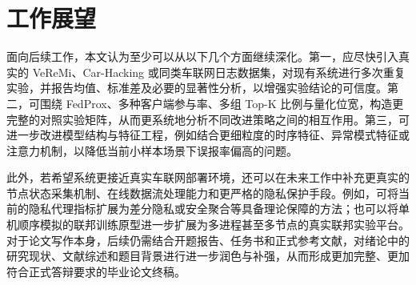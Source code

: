 \section{工作展望}

面向后续工作，本文认为至少可以从以下几个方面继续深化。第一，应尽快引入真实的 VeReMi、Car-Hacking 或同类车联网日志数据集，对现有系统进行多次重复实验，并报告均值、标准差及必要的显著性分析，以增强实验结论的可信度。第二，可围绕 FedProx、多种客户端参与率、多组 Top-K 比例与量化位宽，构造更完整的对照实验矩阵，从而更系统地分析不同改进策略之间的相互作用。第三，可进一步改进模型结构与特征工程，例如结合更细粒度的时序特征、异常模式特征或注意力机制，以降低当前小样本场景下误报率偏高的问题。

此外，若希望系统更接近真实车联网部署环境，还可以在未来工作中补充更真实的节点状态采集机制、在线数据流处理能力和更严格的隐私保护手段。例如，可将当前的隐私代理指标扩展为差分隐私或安全聚合等具备理论保障的方法；也可以将单机顺序模拟的联邦训练原型进一步扩展为多进程甚至多节点的真实联邦实验平台。对于论文写作本身，后续仍需结合开题报告、任务书和正式参考文献，对绪论中的研究现状、文献综述和题目背景进行进一步润色与补强，从而形成更加完整、更加符合正式答辩要求的毕业论文终稿。
